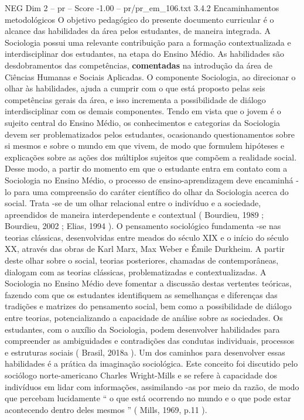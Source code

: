 \begin{textsample}{NEG Dim 2 – pr – Score -1.00 – pr/pr\_em\_106.txt}  \label{ex:f2_neg_177}
3.4.2 Encaminhamentos metodológicos O objetivo pedagógico do presente documento curricular é o alcance das habilidades da área pelos estudantes, de maneira integrada.
A Sociologia possui uma relevante contribuição para a formação contextualizada e interdisciplinar dos estudantes, na etapa do Ensino Médio.
As habilidades são desdobramentos das competências, \textbf{comentadas} na introdução da área de Ciências Humanas e Sociais Aplicadas.
O componente Sociologia, ao direcionar o olhar às habilidades, ajuda a cumprir com o que está proposto pelas seis competências gerais da área, e isso incrementa a possibilidade de diálogo interdisciplinar com os demais componentes.
Tendo em vista que o jovem é o sujeito central do Ensino Médio, os conhecimentos e categorias da Sociologia devem ser problematizados pelos estudantes, ocasionando questionamentos sobre si mesmos e sobre o mundo em que vivem, de modo que formulem hipóteses e explicações sobre as ações dos múltiplos sujeitos que compõem a realidade social.
Desse modo, a partir do momento em que o estudante entra em contato com a Sociologia no Ensino Médio, o processo de ensino-aprendizagem deve encaminhá -lo para uma compreensão do caráter científico do olhar da Sociologia acerca do social.
Trata -se de um olhar relacional entre o indivíduo e a sociedade, apreendidos de maneira interdependente e contextual ( Bourdieu, 1989 ; Bourdieu, 2002 ; Elias, 1994 ).
O pensamento sociológico fundamenta -se nas teorias clássicas, desenvolvidas entre meados do século XIX e o início do século XX, através das obras de Karl Marx, Max Weber e Émile Durkheim.
A partir deste olhar sobre o social, teorias posteriores, chamadas de contemporâneas, dialogam com as teorias clássicas, problematizadas e contextualizadas.
A Sociologia no Ensino Médio deve fomentar a discussão destas vertentes teóricas, fazendo com que os estudantes identifiquem as semelhanças e diferenças das tradições e matrizes do pensamento social, bem como a possibilidade de diálogo entre teorias, potencializando a capacidade de análise sobre as sociedades.
Os estudantes, com o auxílio da Sociologia, podem desenvolver habilidades para compreender as ambiguidades e contradições das condutas individuais, processos e estruturas sociais ( Brasil, 2018a ).
Um dos caminhos para desenvolver essas habilidades é a prática da imaginação sociológica.
Este conceito foi discutido pelo sociólogo norte-americano Charles Wright-Mills e se refere à capacidade dos indivíduos em lidar com informações, assimilando -as por meio da razão, de modo que percebam lucidamente “ o que está ocorrendo no mundo e o que pode estar acontecendo dentro deles mesmos ” ( Mills, 1969, p.11 ).

\end{textsample}
